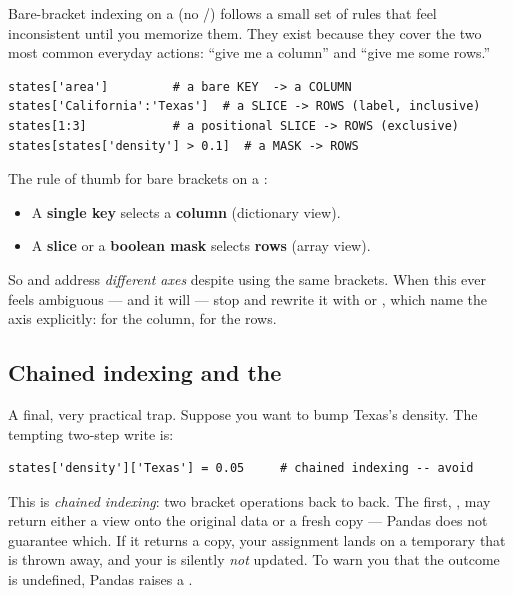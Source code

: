 \documentclass[11pt]{article}
\begin{document}
Bare-bracket indexing on a  (no /) follows a small set of rules that feel inconsistent until you memorize them. They exist because they cover the two most common everyday actions: ``give me a column'' and ``give me some rows.''

\begin{lstlisting}
states['area']         # a bare KEY  -> a COLUMN
states['California':'Texas']  # a SLICE -> ROWS (label, inclusive)
states[1:3]            # a positional SLICE -> ROWS (exclusive)
states[states['density'] > 0.1]  # a MASK -> ROWS
\end{lstlisting}

\begin{keyidea}
The rule of thumb for bare brackets on a :
\begin{itemize}
  \item A \textbf{single key} selects a \textbf{column} (dictionary view).
  \item A \textbf{slice} or a \textbf{boolean mask} selects \textbf{rows} (array view).
\end{itemize}
So  and  address \emph{different axes} despite using the same brackets. When this ever feels ambiguous --- and it will --- stop and rewrite it with  or , which name the axis explicitly:  for the column,  for the rows.
\end{keyidea}

\subsection{Chained indexing and the \texorpdfstring{}{SettingWithCopyWarning}}

A final, very practical trap. Suppose you want to bump Texas's density. The tempting two-step write is:

\begin{lstlisting}
states['density']['Texas'] = 0.05     # chained indexing -- avoid
\end{lstlisting}

This is \emph{chained indexing}: two bracket operations back to back. The first, , may return either a view onto the original data or a fresh copy --- Pandas does not guarantee which. If it returns a copy, your assignment lands on a temporary that is thrown away, and your  is silently \emph{not} updated. To warn you that the outcome is undefined, Pandas raises a .
\end{document}
